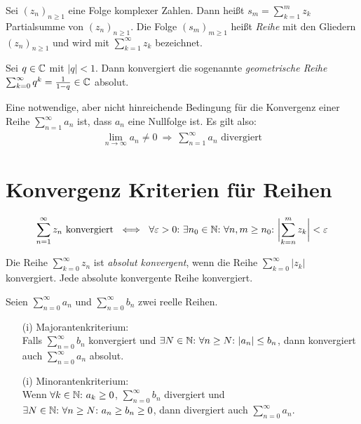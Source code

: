 \begin{frameddefn}[Reihendefinition]
	Sei $(z_n)_{n\geq 1}$ eine Folge komplexer Zahlen. Dann heißt $s_m = \sum_{k=1}^{m} z_k$ Partialsumme von $(z_n)_{n\geq 1}$. Die Folge $(s_m)_{m\geq 1}$ heißt \textit{Reihe} mit den Gliedern $(z_n)_{n\geq 1}$ und wird mit $\sum_{k=1}^{\infty} z_k$ bezeichnet.
\end{frameddefn}

\begin{framedthm}
	Sei $q \in \mathbb{C}$ mit $|q| < 1$. Dann konvergiert die sogenannte \textit{geometrische Reihe} $\sum_{k=0}^{\infty} q^k = \frac{1}{1-q} \in \mathbb{C}$ absolut.
\end{framedthm}

\begin{framedthm}
	Eine notwendige, aber nicht hinreichende Bedingung für die Konvergenz einer Reihe $\sum_{n=1}^{\infty} a_n$ ist, dass $a_n$ eine Nullfolge ist. Es gilt also:
	\begin{align*}
		\lim_{n \to \infty} a_n \neq 0 \ \Rightarrow\ \sum_{n=1}^{\infty} a_n \textrm{ divergiert}
	\end{align*}
\end{framedthm}

\section{Konvergenz Kriterien für Reihen}

\begin{framedthm}
	\begin{align*}
		\sum_{n=1}^{\infty} z_n \textrm{ konvergiert} \ \iff\  \forall \varepsilon > 0{:}\ \exists n_0 \in \mathbb{N}{:}\  \forall n,m \geq n_0{:}\  \biggl|\sum_{k=n}^{m} z_k \biggr| < \varepsilon
	\end{align*}
\end{framedthm}

\begin{frameddefn}
	Die Reihe $\sum_{k=0}^{\infty} z_n$ ist \textit{absolut konvergent}, wenn die Reihe $\sum_{k=0}^{\infty} |z_k|$ konvergiert. Jede absolute konvergente Reihe konvergiert.
\end{frameddefn}

\begin{framedthm} \label{majok}
	Seien $\sum_{n=0}^{\infty} a_n$ und $\sum_{n=0}^{\infty} b_n$ zwei reelle Reihen.
	\begin{enumerate}
		\item[(i)] Majorantenkriterium:\\ Falls $\sum_{n=0}^{\infty} b_n$ konvergiert und $\exists N \in \mathbb{N}{:}\ \forall n \geq N{:}\  |a_n| \leq b_n$, dann konvergiert auch $\sum_{n=0}^{\infty} a_n$ absolut.
		\item[(i)] Minorantenkriterium:\\ Wenn $\forall k \in \mathbb{N}{:}\  a_k \geq 0$, $\sum_{n=0}^{\infty} b_n$ divergiert und $\exists N \in \mathbb{N}{:}\ \forall n \geq N{:}\  a_n \geq b_n \geq 0$, dann divergiert auch $\sum_{n=0}^{\infty} a_n$.
	\end{enumerate}
\end{framedthm}

